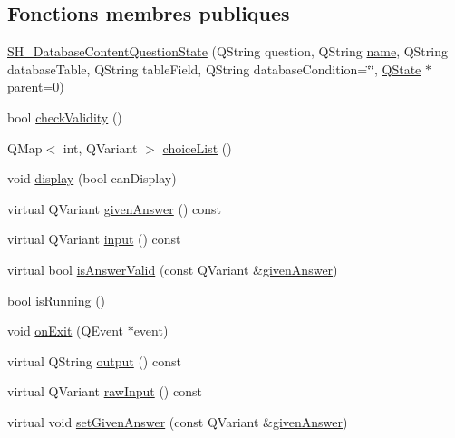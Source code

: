\subsection*{Fonctions membres publiques}
\begin{DoxyCompactItemize}
\item 
\hyperlink{classSH__DatabaseContentQuestionState_ab26490ea519262a8f9ca72c000bf7313}{S\-H\-\_\-\-Database\-Content\-Question\-State} (Q\-String question, Q\-String \hyperlink{classSH__NamedObject_a9f686c6f2a5bcc08ad03d0cee0151f0f}{name}, Q\-String database\-Table, Q\-String table\-Field, Q\-String database\-Condition=\char`\"{}\char`\"{}, \hyperlink{classQState}{Q\-State} $\ast$parent=0)
\item 
bool \hyperlink{classSH__QuestionState_a902be003650c33d954d707b2d3ee0bb9}{check\-Validity} ()
\item 
Q\-Map$<$ int, Q\-Variant $>$ \hyperlink{classSH__DatabaseContentQuestionState_a14ca81b7c20c9e20e9d9e327b513f6ec}{choice\-List} ()
\item 
void \hyperlink{classSH__InOutState_a616f88b20478b81b2927a9ddc2b4f521}{display} (bool can\-Display)
\item 
virtual Q\-Variant \hyperlink{classSH__QuestionState_a29cdea8bc55e39e3ed02d24743c30f8c}{given\-Answer} () const 
\item 
virtual Q\-Variant \hyperlink{classSH__InOutState_a8e1b78069343122df7713624a1a5a100}{input} () const 
\item 
virtual bool \hyperlink{classSH__DatabaseContentQuestionState_a9bd6d20076c08d8e4085d22883ab7d14}{is\-Answer\-Valid} (const Q\-Variant \&\hyperlink{classSH__QuestionState_a29cdea8bc55e39e3ed02d24743c30f8c}{given\-Answer})
\item 
bool \hyperlink{classSH__GenericState_a5f731810dad0cacd28828ccbf1539e4e}{is\-Running} ()
\item 
void \hyperlink{classSH__InOutState_afc0433d63375063a43e39adca641e330}{on\-Exit} (Q\-Event $\ast$event)
\item 
virtual Q\-String \hyperlink{classSH__InOutState_a17ed7eaf5e3ed5af80a4f9fe65d5bfd9}{output} () const 
\item 
virtual Q\-Variant \hyperlink{classSH__DatabaseContentQuestionState_aed9d5e4205ca37d32653475ac13fe097}{raw\-Input} () const 
\item 
virtual void \hyperlink{classSH__QuestionState_a8fec0a91aed0b2b1699db17169873eb0}{set\-Given\-Answer} (const Q\-Variant \&\hyperlink{classSH__QuestionState_a29cdea8bc55e39e3ed02d24743c30f8c}{given\-Answer})

\end{DoxyCompactItemize}
